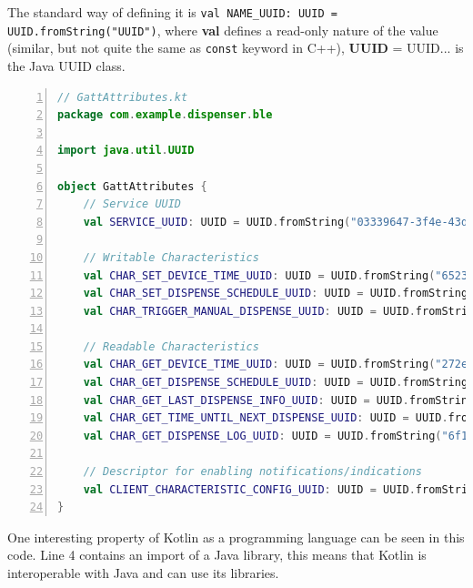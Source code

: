 The standard way of defining it is \texttt{val NAME\_UUID: UUID = UUID.fromString("UUID")}, where \textbf{val} defines a read-only nature of the value (similar, but not quite the same as \texttt{const} keyword in C++), \textbf{UUID} = UUID... is the Java UUID class.



\begin{lstlisting}[style=kotlinstyle,caption={\ac{GATT} attributes defined in a separate file},label={lst:GATTs},float=htbp,language=Kotlin,numbers=left]
// GattAttributes.kt
package com.example.dispenser.ble

import java.util.UUID

object GattAttributes {
	// Service UUID
	val SERVICE_UUID: UUID = UUID.fromString("03339647-3f4e-43df-abff-fac54287cf1a")
	
	// Writable Characteristics
	val CHAR_SET_DEVICE_TIME_UUID: UUID = UUID.fromString("65232f1d-618a-4268-9050-0548142a4536")
	val CHAR_SET_DISPENSE_SCHEDULE_UUID: UUID = UUID.fromString("999c584e-06c0-49a1-995a-66b7c802ac1b")
	val CHAR_TRIGGER_MANUAL_DISPENSE_UUID: UUID = UUID.fromString("36bb95f2-e57e-4db9-b9aa-fb6541ee784e")
	
	// Readable Characteristics
	val CHAR_GET_DEVICE_TIME_UUID: UUID = UUID.fromString("272ee276-e37e-4d78-8c5e-bb7225d35074")
	val CHAR_GET_DISPENSE_SCHEDULE_UUID: UUID = UUID.fromString("b53c2ed4-ae26-476d-8414-011a025dddfc")
	val CHAR_GET_LAST_DISPENSE_INFO_UUID: UUID = UUID.fromString("40d3b5d8-5480-4b7b-a115-5fe86bf17d7d")
	val CHAR_GET_TIME_UNTIL_NEXT_DISPENSE_UUID: UUID = UUID.fromString("4b14acc4-768a-43e1-9d6c-0d97307e2666")
	val CHAR_GET_DISPENSE_LOG_UUID: UUID = UUID.fromString("6f182da7-c5a8-40ab-a637-f97ed6b5777b")
	
	// Descriptor for enabling notifications/indications
	val CLIENT_CHARACTERISTIC_CONFIG_UUID: UUID = UUID.fromString("00002902-0000-1000-8000-00805f9b34fb")
}
\end{lstlisting}
One interesting property of Kotlin as a programming language can be seen in this code. Line 4 contains an import of a Java library, this means that Kotlin is interoperable with Java and can use its libraries.

